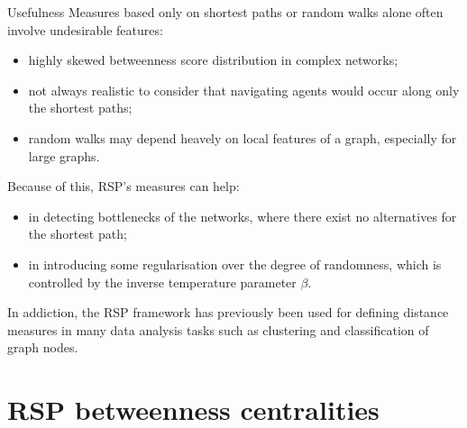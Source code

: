 \documentclass[13pt]{beamer}
\begin{document}
    \begin{frame}[t,allowframebreaks]{Usefulness}
    Measures based only on shortest paths or random walks alone often involve undesirable features:
    \begin{itemize}
        \item highly skewed betweenness score distribution in complex networks;

        \item not always realistic to consider that navigating agents would occur along only the shortest paths;

        \item random walks may depend heavely on local features of a graph, especially for large graphs.
    \end{itemize}

    \newpage

    Because of this, RSP's measures can help:
    \begin{itemize}
        \item in detecting bottlenecks of the networks, where there exist no alternatives for the shortest path;

        \item in introducing some regularisation over the degree of randomness, which is controlled by the inverse temperature parameter $\beta$.
    \end{itemize}
    \vspace{0.8em}
    In addiction, the RSP framework has previously been used for defining distance measures in many data analysis tasks such as clustering and classification of graph nodes.
    \end{frame}


    \section{RSP betweenness centralities}
\end{document}
